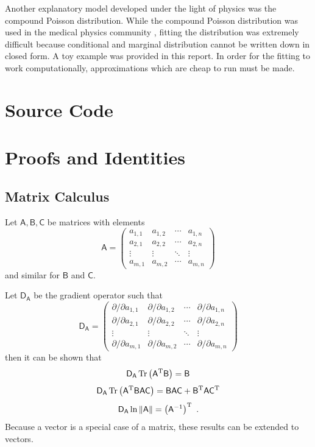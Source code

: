 \documentclass[12pt]{report}
\DeclareMathOperator{\trace}{Tr}
\newcommand{\T}{^\textup{T}}
\newcommand{\matr}[1]{\mathsf{#1}}
\begin{document}
Another explanatory model developed under the light of physics was the compound Poisson distribution. While the compound Poisson distribution was used in the medical physics community \cite{whiting2006properties}, fitting the distribution was extremely difficult because conditional and marginal distribution cannot be written down in closed form. A toy example was provided in this report. In order for the fitting to work computationally, approximations which are cheap to run must be made.

\appendix

\chapter{Source Code}

\chapter{Proofs and Identities}

\section{Matrix Calculus}\label{chapter:matrixCalculus}
Let $\matr{A},\matr{B},\matr{C}$ be matrices with elements
\begin{equation*}
\matr{A}=
\begin{pmatrix}
a_{1,1}&a_{1,2}&\cdots&a_{1,n} \\
a_{2,1}&a_{2,2}&\cdots&a_{2,n} \\
\vdots&\vdots&\ddots&\vdots \\
a_{m,1}&a_{m,2}&\cdots&a_{m,n} 
\end{pmatrix}
\end{equation*}
and similar for $\matr{B}$ and $\matr{C}$.

Let $\matr{D_{A}}$ be the gradient operator such that
\begin{equation*}
\matr{D_{A}}=
\begin{pmatrix}
\partial/\partial a_{1,1}&\partial/\partial a_{1,2}&\cdots&\partial/\partial a_{1,n} \\
\partial/\partial a_{2,1}&\partial/\partial a_{2,2}&\cdots&\partial/\partial a_{2,n} \\
\vdots&\vdots&\ddots&\vdots \\
\partial/\partial a_{m,1}&\partial/\partial a_{m,2}&\cdots&\partial/\partial a_{m,n} 
\end{pmatrix}
\end{equation*}
then it can be shown that \cite{petersen2008matrix}
\begin{equation}
\matr{D_{A}}\trace\left(\matr{A}\T\matr{B}\right) = \matr{B}
\end{equation}
\begin{equation}
\matr{D_{A}}\trace\left(\matr{A}\T\matr{B}\matr{A}\matr{C}\right) = \matr{B}\matr{A}\matr{C}+\matr{B}\T\matr{A}\matr{C}\T
\end{equation}
\begin{equation}
\matr{D_{A}}\ln\left\|\matr{A}\right\| = \left(\matr{A}^{-1}\right)\T \ .
\end{equation}
Because a vector is a special case of a matrix, these results can be extended to vectors.
\end{document}
